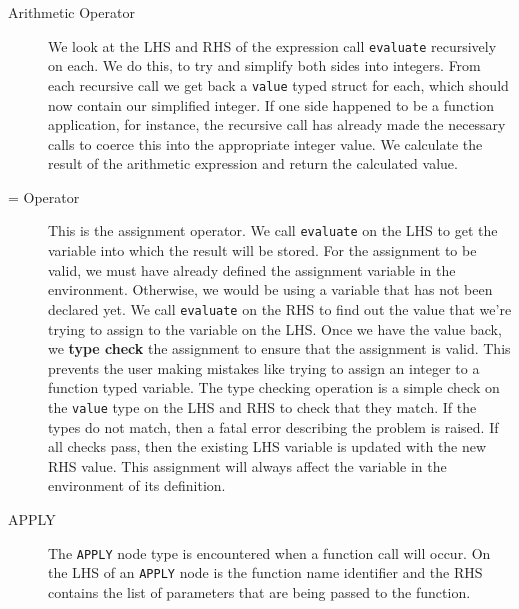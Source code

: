 \begin{description}
	\item[Arithmetic Operator] We look at the LHS and RHS of the expression call \verb!evaluate! recursively on each. We do this, to try and simplify both sides into integers. From each recursive call we get back a \verb!value! typed struct for each, which should now contain our simplified integer. If one side happened to be a function application, for instance, the recursive call has already made the necessary calls to coerce this into the appropriate integer value. We calculate the result of the arithmetic expression and return the calculated value.
	\item[= Operator] This is the assignment operator. We call \verb!evaluate! on the LHS to get the variable into which the result will be stored. For the assignment to be valid, we must have already defined the assignment variable in the environment. Otherwise, we would be  using a variable that has not been declared yet. We call \verb!evaluate! on the RHS to find out the value that we're trying to assign to the variable on the LHS. Once we have the value back, we \textbf{type check} the assignment to ensure that the assignment is valid. This prevents the user making mistakes like trying to assign an integer to a function typed variable. The type checking operation is a simple check on the \verb!value! type on the LHS and RHS to check that they match. If the types do not match, then a fatal error describing the problem is raised. If all checks pass, then the existing LHS variable is updated with the new RHS value. This assignment will always affect the variable in the environment of its definition.
	\item[APPLY] The \verb!APPLY! node type is encountered when a function call will occur. On the LHS of an \verb!APPLY! node is the function name identifier and the RHS contains the list of parameters that are being passed to the function.
\end{description}


